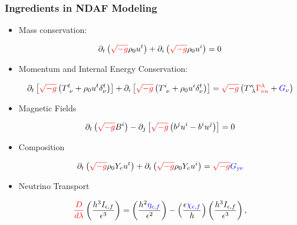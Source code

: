 \documentclass[]{beamer}
\newcommand{\paren}[1]{\left( #1 \right)}
\newcommand{\sqrbrace}[1]{\left[ #1 \right]}
\newcommand{\detg}{\sqrt{-g}}
\newcommand{\eepsilon}{\epsilon} %
\newcommand{\etanuf}{\eta_{\eepsilon,f}}
\newcommand{\Inuf}{I_{\eepsilon,f}}
\newcommand{\chinuf}{\chi_{\eepsilon,f}}
\begin{document}
\begin{frame}
  \frametitle{Ingredients in NDAF Modeling}
  \begin{itemize}
  \item Mass conservation:
    \begin{small}
      \begin{displaymath}
        \partial_t \paren{{\color{red}\detg}\rho_0 u^t}
        + \partial_i\paren{{\color{red}\detg}\rho_0u^i} = 0
      \end{displaymath}
    \end{small}
  \item Momentum and Internal Energy Conservation:
    \begin{small}
      \begin{displaymath}
        \partial_t\sqrbrace{{\color{red}\detg} \paren{T^t_{\ \nu} + \rho_0u^t \delta^t_\nu}}
        + \partial_i\sqrbrace{{\color{red}\detg}\paren{T^i_{\ \nu} + \rho_0 u^i \delta^t_\nu}}
        = {\color{red}\detg} \paren{T^\kappa_{\ \lambda} {\color{red}\Gamma^\lambda_{\nu\kappa}} + {\color{blue}G_\nu}}
      \end{displaymath}
    \end{small}
  \item Magnetic Fields
    \begin{small}
      \begin{displaymath}
        \partial_t \paren{{\color{red}\detg} B^i}
        - \partial_j \sqrbrace{{\color{red}\detg}\paren{b^ju^i - b^i u^j}}
        = 0
      \end{displaymath}
    \end{small}
  \item Composition
    \begin{small}
      \begin{displaymath}
        \partial_t\paren{{\color{red}\detg}\rho_0 Y_e u^t}
        + \partial_i\paren{{\color{red}\detg}\rho_0Y_eu^i}
        = {\color{red}\detg} {\color{blue}G_{\text{ye}}}
      \end{displaymath}
    \end{small}
  \item Neutrino Transport
    \begin{small}
      \begin{displaymath}
        {\color{red}\frac{D}{d\lambda}}\paren{\frac{h^3\Inuf}{\eepsilon^3}}
        = \paren{\frac{h^2{\color{blue}\etanuf}}{\eepsilon^2}}
        - \paren{\frac{\eepsilon {\color{blue}\chinuf}}{h}} \paren{\frac{h^3\Inuf}{\eepsilon^3}},
      \end{displaymath}
    \end{small}
  \end{itemize}
\end{frame}
\end{document}
